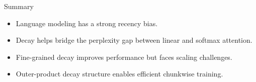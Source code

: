 \begin{frame}{Summary}
    \begin{itemize}
        \item Language modeling has a strong recency bias.
        \item Decay helps bridge the perplexity gap between linear and softmax attention.
        \item Fine-grained decay improves performance but faces scaling challenges.
        \item Outer-product decay structure enables efficient chunkwise training.
    \end{itemize}
\end{frame}




